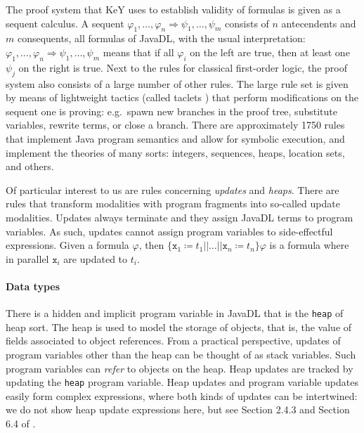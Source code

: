 \documentclass[runningheads]{llncs}
\begin{document}
The proof system that KeY uses to establish validity of formulas is given as a sequent calculus. A sequent $\varphi_1,\ldots,\varphi_n \Rightarrow \psi_1,\ldots,\psi_m$ consists of $n$ antecendents and $m$ consequents, all formulas of JavaDL, with the usual interpretation: $\varphi_1,\ldots,\varphi_n \Rightarrow \psi_1,\ldots,\psi_m$ means that if all $\varphi_i$ on the left are true, then at least one $\psi_j$ on the right is true. Next to the rules for classical first-order logic, the proof system also consists of a large number of other rules. The large rule set is given by means of lightweight tactics (called taclets \cite{beckert2004taclets}) that perform modifications on the sequent one is proving: e.g.~spawn new branches in the proof tree, substitute variables, rewrite terms, or close a branch. There are approximately 1750 rules that implement Java program semantics and allow for symbolic execution, and implement the theories of many sorts: integers, sequences, heaps, location sets, and others.

Of particular interest to us are rules concerning \emph{updates} and \emph{heaps}. There are rules that transform modalities with program fragments into so-called update modalities. Updates always terminate and they assign JavaDL terms to program variables. As such, updates cannot assign program variables to side-effectful expressions. Given a formula $\varphi$, then $\{\mathtt{x}_1\coloneqq t_1||\ldots||\mathtt{x}_n\coloneqq t_n\}\varphi$ is a formula where in parallel $\mathtt{x}_i$ are updated to $t_i$.

\paragraph{Data types}
There is a hidden and implicit program variable in JavaDL that is the \texttt{heap} of heap sort. The heap is used to model the storage of objects, that is, the value of fields associated to object references. From a practical perspective, updates of program variables other than the heap can be thought of as stack variables. Such program variables can \emph{refer} to objects on the heap. Heap updates are tracked by updating the \texttt{heap} program variable. Heap updates and program variable updates easily form complex expressions, where both kinds of updates can be intertwined: we do not show heap update expressions here, but see Section 2.4.3 and Section 6.4 of \cite{ahrendt2016deductive}.
\end{document}
